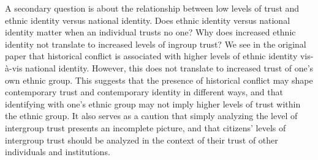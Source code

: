 A secondary question is about the relationship between low levels of trust and ethnic identity versus national identity. Does ethnic identity versus national identity matter when an individual trusts no one? Why does increased ethnic identity not translate to increased levels of ingroup trust? We see in the original paper that historical conflict is associated with higher levels of ethnic identity vis-\`{a}-vis national identity. However, this does not translate to increased trust of one's own ethnic group. This suggests that the presence of historical conflict may shape contemporary trust and contemporary identity in different ways, and that identifying with one's ethnic group may not imply higher levels of trust within the ethnic group. It also serves as a caution that simply analyzing the level of intergroup trust presents an incomplete picture, and that citizens' levels of intergroup trust should be analyzed in the context of their trust of other individuals and institutions. 





























